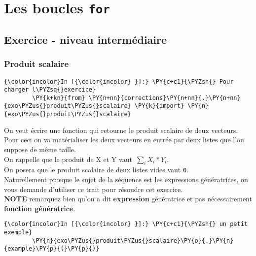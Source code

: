     \hypertarget{les-boucles-for}{%
\section{\texorpdfstring{Les boucles
\texttt{for}}{Les boucles for}}\label{les-boucles-for}}


    \hypertarget{exercice---niveau-intermuxe9diaire}{%
\subsection{Exercice - niveau
intermédiaire}\label{exercice---niveau-intermuxe9diaire}}

    \hypertarget{produit-scalaire}{%
\subsubsection{Produit scalaire}\label{produit-scalaire}}

    \begin{Verbatim}[commandchars=\\\{\}]
{\color{incolor}In [{\color{incolor} }]:} \PY{c+c1}{\PYZsh{} Pour charger l\PYZsq{}exercice}
        \PY{k+kn}{from} \PY{n+nn}{corrections}\PY{n+nn}{.}\PY{n+nn}{exo\PYZus{}produit\PYZus{}scalaire} \PY{k}{import} \PY{n}{exo\PYZus{}produit\PYZus{}scalaire}
\end{Verbatim}


    On veut écrire une fonction qui retourne le produit scalaire de deux
vecteurs. Pour ceci on va matérialiser les deux vecteurs en entrée par
deux listes que l'on suppose de même taille.\\

On rappelle que le produit de X et Y vaut~\(\sum_{i} X_i * Y_i\).\\

On posera que le produit scalaire de deux listes vides vaut \texttt{0}.\\

    Naturellement puisque le sujet de la séquence est les expressions
génératrices, on vous demande d'utiliser ce trait pour résoudre cet
exercice.\\

\textbf{NOTE} remarquez bien qu'on a dit \textbf{expression} génératrice
et pas nécessairement \textbf{fonction génératrice}.

    \begin{Verbatim}[commandchars=\\\{\}]
{\color{incolor}In [{\color{incolor} }]:} \PY{c+c1}{\PYZsh{} un petit exemple}
        \PY{n}{exo\PYZus{}produit\PYZus{}scalaire}\PY{o}{.}\PY{n}{example}\PY{p}{(}\PY{p}{)}
\end{Verbatim}


